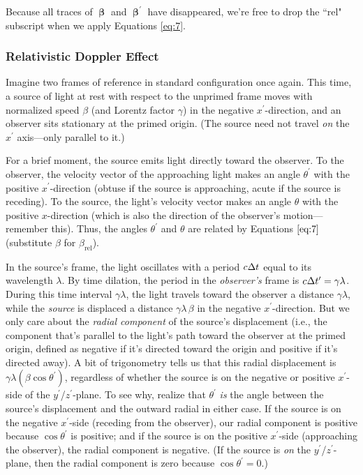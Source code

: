 \documentclass[12pt]{article}
\newcommand{\vvbeta}{\bm{\upbeta}}
\begin{document}
Because all traces of $\vvbeta$ and $\vvbeta^{\prime}$ have disappeared, we're free to drop the ``rel" subscript when we apply Equations \ref{eq:7}.


\subsubsection{Relativistic Doppler Effect}\label{sssec:rdf}
Imagine two frames of reference in standard configuration once again. This time, a source of light at rest with respect to the unprimed frame moves with normalized speed $\beta$ (and Lorentz factor $\gamma$) in the negative $x^\prime$-direction, and an observer sits stationary at the primed origin. (The source need not travel \emph{on} the $x^\prime$ axis---only parallel to it.)

For a brief moment, the source emits light directly toward the observer. To the observer, the velocity vector of the approaching light makes an angle $\theta^\prime$ with the positive $x^\prime$-direction (obtuse if the source is approaching, acute if the source is receding). To the source, the light's velocity vector makes an angle $\theta$ with the positive $x$-direction (which is also the direction of the observer's motion---remember this). Thus, the angles $\theta^\prime$ and $\theta$ are related by Equations $\ref{eq:7}$ (substitute $\beta$ for $\beta_{\textrm{rel}}$).

In the source's frame, the light oscillates with a period $c \mkern.5mu \Delta t$ equal to its wavelength $\lambda$. By time dilation, the period in the \emph{observer's} frame is $c \mkern.5mu \Delta t^\prime = \gamma \lambda$. During this time interval $\gamma \lambda$, the light travels toward the observer a distance $\gamma \lambda$, while the \emph{source} is displaced a distance $\gamma \lambda \, \beta$ in the negative $x^\prime$-direction. But we only care about the \emph{radial component} of the source's displacement (i.e., the component that's parallel to the light's path toward the observer at the primed origin, defined as negative if it's directed toward the origin and positive if it's directed away). A bit of trigonometry tells us that this radial displacement is $\gamma \lambda (\beta \cos \theta^\prime)$, regardless of whether the source is on the negative or positive $x^\prime$-side of the $y^\prime$/$z^\prime$-plane. To see why, realize that $\theta^\prime$ \emph{is} the angle between the source's displacement and the outward radial in either case. If the source is on the negative $x^\prime$-side (receding from the observer), our radial component is positive because $\cos \theta^\prime$ is positive; and if the source is on the positive $x^\prime$-side (approaching the observer), the radial component is negative. (If the source is \emph{on} the $y^\prime$/$z^\prime$-plane, then the radial component is zero because $\cos \theta^\prime = 0$.)
\end{document}
